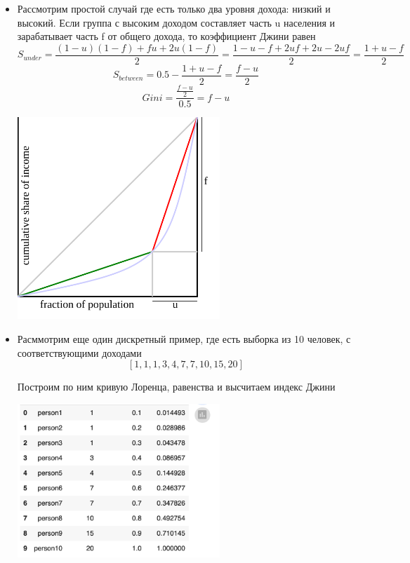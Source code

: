 \begin{itemize}
    \item Рассмотрим простой случай где есть только два уровня дохода: низкий и высокий. Если группа с высоким доходом составляет часть u населения и зарабатывает часть f от общего дохода, то коэффициент Джини равен
          $$S_{under} = \frac{(1-u)(1-f) + fu + 2u(1 - f)}{2} = \frac{1 - u - f + 2uf + 2u -2uf}{2} = \frac{1 + u - f}{2}$$
          $$S_{between} = 0.5 - \frac{1 + u - f}{2} = \frac{f - u}{2}$$
          $$Gini = \frac{\frac{f - u}{2}}{0.5} = f - u$$

          \begin{center}
              \includegraphics[width=0.6\textwidth]{chapters/gini/pics/prim.png}
          \end{center}

    \item Расммотрим еще один дискретный пример, где есть выборка из 10 человек, с соответствующими доходами $$[1, 1, 1, 3, 4, 7, 7, 10, 15, 20]$$

          Построим по ним кривую Лоренца, равенства и высчитаем индекс Джини


          \begin{center}
              \includegraphics[width=0.6\textwidth]{chapters/gini/pics/stolb.png}
          \end{center}



\end{itemize}
